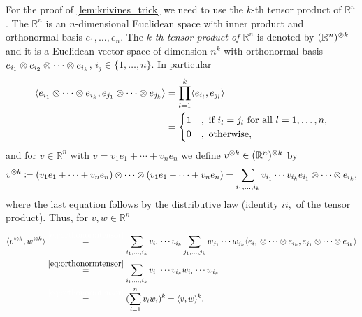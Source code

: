 	\noindent For the proof of \ref{lem:krivines_trick} we need to use the $k$-th tensor product of $\mathbb{R}^n$. The $\mathbb{R}^n$ is an $n$-dimensional Euclidean space with inner product \sclr{\cdot}{\cdot} and orthonormal basis $e_1,\dots,e_n$. The \emph{$k$-th tensor product of $\mathbb{R}^n$} is denoted by $(\mathbb{R}^n)^{\otimes k}$ and it is a Euclidean  vector space of dimension $n^k$ with orthonormal basis $e_{i_1}\otimes e_{i_2} \otimes \cdots \otimes e_{i_k}$, $i_j\in\{1,\dots,n\}$. In particular
	\begin{align}
		\langle{e_{i_1}\ensuremath{\otimes}\cdots \ensuremath{\otimes}e_{i_k}},{e_{j_1}\otimes \cdots \otimes e_{j_k}}\rangle
		&= \prod_{l=1}^k \langle{e_{i_l}},{e_{j_l}}\rangle\nonumber\\
		&=\begin{cases}
			1 & , \text{ if } i_l=j_l \text{ for all } l=1,\dots,n,\\
			0 & , \text{ otherwise},
		\end{cases} \label{eq:orthonormtensor}
	\end{align}
	and for $v\in\mathbb{R}^n$ with $v=v_1e_1+\cdots +v_ne_n$ we define $v^{\otimes k} \in (\mathbb{R}^n)^{\otimes k}$ by 
	\begin{equation}
		v^{\otimes k} \coloneqq (v_1e_1 + \cdots + v_ne_n) \otimes \cdots \otimes (v_1e_1 + \cdots + v_ne_n) = \sum_{i_1,\dots,i_k} v_{i_1}\cdots v_{i_k} e_{i_1}\otimes\cdots\otimes e_{i_k},
	\end{equation}
	where the last equation follows by the distributive law (identity $ii,$ of the tensor product). 
	Thus, for $v,w\in\mathbb{R}^n$ 
	\begin{align}
		\sclr{v^{\tensor k}}{w^{\tensor k}}
		&\overset{\textcolor{white}{\eqref*{eq:orthonormtensor}}}{=} \sum_{i_1,\dots,i_k} v_{i_1}\cdots v_{i_k} \sum_{j_1,\dots,j_k} w_{j_1}\cdots w_{j_k} \sclr{e_{i_1}\tensor\cdots\tensor e_{i_k}}{e_{j_1}\tensor\cdots\tensor e_{j_k}} \nonumber\\
		&\overset{\eqref{eq:orthonormtensor}}{=} \sum_{i_1,\dots,i_k} v_{i_1}\cdots v_{i_k}w_{i_1}\cdots w_{i_k} \nonumber\\
		&\overset{\textcolor{white}{\eqref*{eq:orthonormtensor}}}{=}(\sum_{i=1}^n v_iw_i)^k = \sclr{v}{w}^k. \label{eq:kth_tensor}
	\end{align}
